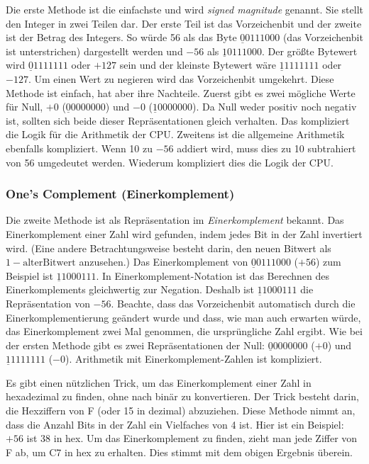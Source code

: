 Die erste Methode ist die einfachste und wird \emph{signed
magnitude} genannt. Sie stellt den Integer in zwei Teilen dar. Der
erste Teil ist das Vorzeichenbit und der zweite ist der Betrag des
Integers. So w\"{u}rde 56 als das Byte $\underline{0}0111000$ (das
Vorzeichenbit ist unterstrichen) dargestellt werden und $-56$ als
$\underline{1}0111000$. Der gr\"{o}{\ss}te Bytewert wird
$\underline{0}1111111$ oder $+127$ sein und der kleinste Bytewert
w\"{a}re $\underline{1}1111111$ oder $-127$. Um einen Wert zu negieren
wird das Vorzeichenbit umgekehrt. Diese Methode ist einfach, hat
aber ihre Nachteile. Zuerst gibt es zwei m\"{o}gliche Werte f\"{u}r Null,
$+0$ ($\underline{0}0000000$) und $-0$ ($\underline{1}0000000$). Da
Null weder positiv noch negativ ist, sollten sich beide dieser
Repr\"{a}sentationen gleich verhalten. Das kompliziert die Logik f\"{u}r die
Arithmetik der CPU\@. Zweitens ist die allgemeine Arithmetik
ebenfalls kompliziert. Wenn 10 zu $-56$ addiert wird, muss dies zu
10 subtrahiert von 56 umgedeutet werden. Wiederum kompliziert dies
die Logik der CPU\@.

\subsubsection{One's Complement (Einerkomplement)
  }

Die zweite Methode ist als Repr\"{a}sentation im \emph{Einerkomplement}
bekannt. Das Einerkomplement einer Zahl wird gefunden, indem jedes
Bit in der Zahl invertiert wird. (Eine andere Betrachtungsweise
besteht darin, den neuen Bitwert als $1 - \mathrm{alter Bitwert}$
anzusehen.) Das Einerkomplement von $\underline{0}0111000$ ($+56$)
zum Beispiel ist $\underline{1}1000111$. In Einerkomplement-Notation
ist das Berechnen des Einerkomplements gleichwertig zur Negation.
Deshalb ist $\underline{1}1000111$ die Repr\"{a}sentation von $-56$.
Beachte, dass das Vorzeichenbit automatisch durch die
Einerkomplementierung ge\"{a}ndert wurde und dass, wie man auch erwarten
w\"{u}rde, das Einerkomplement zwei Mal genommen, die urspr\"{u}ngliche Zahl
ergibt. Wie bei der ersten Methode gibt es zwei Repr\"{a}sentationen der
Null: $\underline{0}0000000$ ($+0$) und $\underline{1}1111111$
($-0$). Arithmetik mit Einerkomplement-Zahlen ist kompliziert.

Es gibt einen n\"{u}tzlichen Trick, um das Einerkomplement einer Zahl in
hexadezimal zu finden, ohne nach bin\"{a}r zu konvertieren. Der Trick
besteht darin, die Hexziffern von F (oder 15 in dezimal) abzuziehen.
Diese Methode nimmt an, dass die Anzahl Bits in der Zahl ein
Vielfaches von 4 ist. Hier ist ein Beispiel: $+56$ ist 38 in hex. Um
das Einerkomplement zu finden, zieht man jede Ziffer von F ab, um C7
in hex zu erhalten. Dies stimmt mit dem obigen Ergebnis \"{u}berein.

